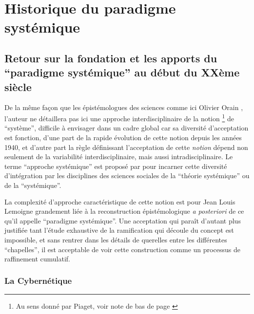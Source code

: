 


\graphicspath{{FigureAnnexe/}}

\renewcommand{\appendixpagename}{Annexes}
\renewcommand{\appendixtocname}{Annexes}

\appendix
{}
\appendixpage


\chapter{Historique du paradigme systémique}

\section{Retour sur la fondation et les apports du \enquote{paradigme systémique} au début du XXème siècle}
\label{ssec:systemique}

De la même façon que les épistémologues des sciences comme ici Olivier Orain \autocite{Orain2001}, l'auteur ne détaillera pas ici une approche interdisciplinaire de la notion \footnote{Au sens donné par Piaget, voir note de bas de page \autocite {Orain2001}} de \enquote{système}, difficile à envisager dans un cadre global car sa diversité d'acceptation est fonction, d'une part de la rapide évolution de cette notion depuis les années 1940, et d'autre part la règle définissant l'acceptation de cette \textit{notion} dépend non seulement de la variabilité interdisciplinaire, mais aussi intradisciplinaire. Le terme \enquote{approche systémique} est proposé par \autocite{Orain2001} pour incarner cette diversité d'intégration par les disciplines des sciences sociales de la \enquote{théorie systémique} ou de la \enquote{systémique}.

La complexité d'approche caractéristique de cette notion est pour Jean Louis Lemoigne grandement liée à la reconstruction épistémologique \textit{a posteriori} de ce qu'il appelle \enquote{paradigme systémique}. Une acceptation qui paraît d'autant plus justifiée tant l'étude exhaustive de la ramification qui découle du concept est impossible, et sans rentrer dans les détails de querelles entre les différentes \enquote{chapelles}, il est acceptable de voir cette construction comme un processus de raffinement cumulatif. 

\subsection{La Cybernétique}
\label{ssubsec:cybernetic}

